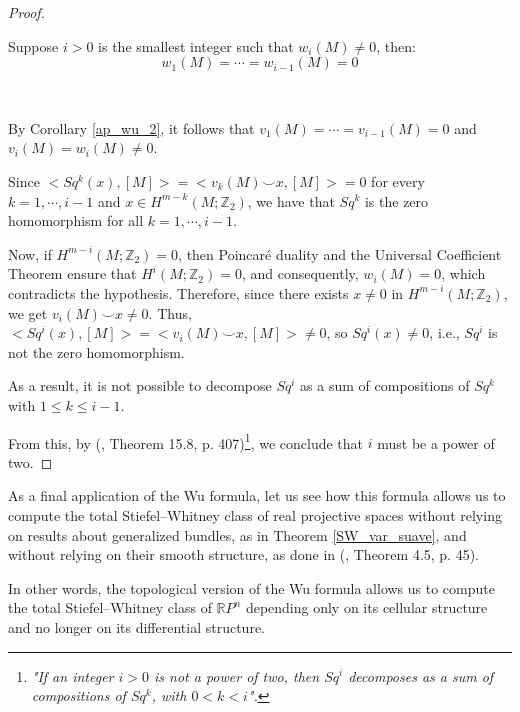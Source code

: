\documentclass[12pt,oneside]{book}
\newcommand{\RP}{\mathbb{R}P}
\newcommand{\Z}{\mathbb{Z}}
\newcommand{\ccup}{\smile}
\begin{document}
    \begin{proof}

        \

    	Suppose $i>0$ is the smallest integer such that $w_{i}(M)\neq 0$, then:
        $$w_{1}(M)=\cdots=w_{i-1}(M)=0$$

        \
        
        By Corollary \ref{ap_wu_2}, it follows that $v_{1}(M)=\cdots=v_{i-1}(M)=0$ and $v_{i}(M)=w_{i}(M)\neq 0$.

    	Since $<Sq^{k}(x),[M]>=<v_{k}(M)\ccup x,[M]>=0$ for every $k=1,\cdots,i-1$ and $x\in H^{m-k}(M;\Z_{2})$, we have that $Sq^{k}$ is the 
        zero homomorphism for all $k=1,\cdots,i-1$.

    	Now, if $H^{m-i}(M;\Z_{2})=0$, then Poincaré duality and the Universal Coefficient Theorem ensure that $H^{i}(M;\Z_{2})=0$, and 
        consequently, $w_{i}(M)=0$, which contradicts the hypothesis. Therefore, since there exists $x\neq 0$ in $H^{m-i}(M;\Z_{2})$, we get 
        $v_{i}(M)\ccup x\neq 0$. Thus, $<Sq^{i}(x),[M]>=<v_{i}(M)\ccup x,[M]>\neq 0$, so $Sq^{i}(x)\neq 0$, i.e., $Sq^{i}$ is not the zero 
        homomorphism.

    	As a result, it is not possible to decompose $Sq^{i}$ as a sum of compositions of $Sq^{k}$ with $1\leq k\leq i-1$.

    	From this, by (\cite{bredon}, Theorem 15.8, p. 407)\footnote{\textit{"If an integer $i>0$ is not a power of two, then $Sq^{i}$ 
        decomposes as a sum of compositions of $Sq^{k}$, with $0<k<i$".}}, we conclude that $i$ must be a power of two.

    \end{proof}

    As a final application of the Wu formula, let us see how this formula allows us to compute the total Stiefel–Whitney 
    class of real projective spaces without relying on results about 
    generalized bundles, as in Theorem \ref{SW_var_suave}, and without relying on their smooth structure, as done 
    in (\cite{milnor_1}, Theorem 4.5, p. 45).

    In other words, the topological version of the Wu formula allows us to compute the total Stiefel–Whitney class of $\RP^{n}$ depending 
    only on its cellular structure and no longer on its differential structure.
\end{document}
